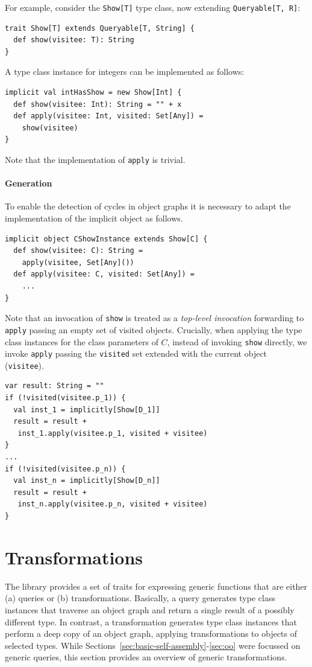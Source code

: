 \documentclass[preprint,nocopyrightspace]{sigplanconf}
\begin{document}
For example, consider the \verb|Show[T]| type class, now extending
\verb|Queryable[T, R]|:
\begin{lstlisting}
trait Show[T] extends Queryable[T, String] {
  def show(visitee: T): String
}
\end{lstlisting}
\noindent
A type class instance for integers can be implemented as follows:
\begin{lstlisting}
implicit val intHasShow = new Show[Int] {
  def show(visitee: Int): String = "" + x
  def apply(visitee: Int, visited: Set[Any]) =
    show(visitee)
}
\end{lstlisting}
\noindent
Note that the implementation of \verb|apply| is trivial.

\paragraph{Generation}

To enable the detection of cycles in object graphs it is necessary to
adapt the implementation of the implicit object as follows.

\begin{lstlisting}
implicit object CShowInstance extends Show[C] {
  def show(visitee: C): String =
    apply(visitee, Set[Any]())
  def apply(visitee: C, visited: Set[Any]) =
    ...
}
\end{lstlisting}
\noindent
Note that an invocation of \verb|show| is treated as a \emph{top-level
invocation} forwarding to \verb|apply| passing an empty set of visited
objects. Crucially, when applying the type class instances for the class
parameters of $C$, instead of invoking \verb|show| directly, we invoke
\verb|apply| passing the \verb|visited| set extended with the current object
(\verb|visitee|).

\begin{lstlisting}
var result: String = ""
if (!visited(visitee.p_1)) {
  val inst_1 = implicitly[Show[D_1]]
  result = result +
   inst_1.apply(visitee.p_1, visited + visitee)
}
...
if (!visited(visitee.p_n)) {
  val inst_n = implicitly[Show[D_n]]
  result = result +
   inst_n.apply(visitee.p_n, visited + visitee)
}
\end{lstlisting}
\noindent


\section{Transformations}\label{sec:queries-transformations}

The library provides a set of traits for expressing generic functions that are
either (a) queries or (b) transformations. Basically, a query generates type
class instances that traverse an object graph and return a single result of a
possibly different type. In contrast, a transformation generates type class
instances that perform a deep copy of an object graph, applying
transformations to objects of selected types. While
Sections~\ref{sec:basic-self-assembly}-\ref{sec:oo} were focussed on generic
queries, this section provides an overview of generic transformations.
\end{document}
